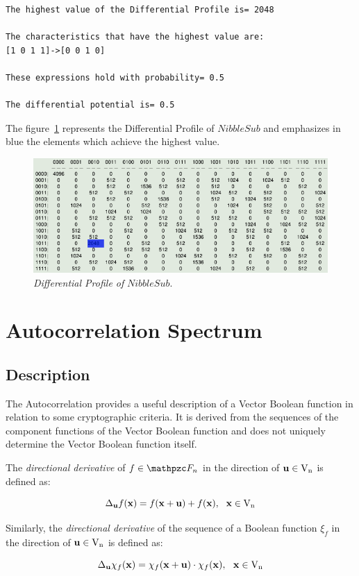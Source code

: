 \begin{example}
\begin{verbatim}
The highest value of the Differential Profile is= 2048

The characteristics that have the highest value are:
[1 0 1 1]->[0 0 1 0]

These expressions hold with probability= 0.5

The differential potential is= 0.5
\end{verbatim}

The figure~\ref{fig:DP} represents the Differential Profile of $NibbleSub$ and emphasizes in blue the elements which achieve the highest value. 

\begin{figure}[htbp!]
\centering
\includegraphics[width=\textwidth]{DP}
\caption[Differential Profile of NibbleSub]{\textit{Differential Profile of }$NibbleSub$.}
\label{fig:DP}
\end{figure}

\end{example}

\section{Autocorrelation Spectrum}
\label{sec:AC}

\subsection{Description}

The Autocorrelation provides a useful description of a Vector Boolean function in relation to some cryptographic criteria. It is derived from the sequences of the component functions of the Vector Boolean function and does not uniquely determine the Vector Boolean function itself.

\begin{definition}
The \textit{directional derivative} of $f \in \funct{F}_n$ in the direction of $\vec{u} \in \gf{V_n}$ is defined as:

\begin{equation}
    \Delta_{\vec{u}}f(\vec{x}) = f(\vec{x}+\vec{u}) + f(\vec{x}), \  \  \vec{x} \in \gf{V_n} 
\end{equation}

Similarly, the \textit{directional derivative} of the sequence of a Boolean function $\xi_f$ in the direction of $\vec{u} \in \gf{V_n}$ is defined as:

\begin{equation}
    \Delta_{\vec{u}} \chi_f(\vec{x}) = \chi_f(\vec{x}+\vec{u}) \cdot \chi_f(\vec{x}), \  \  \vec{x} \in \gf{V_n} 
\end{equation}
\end{definition}


